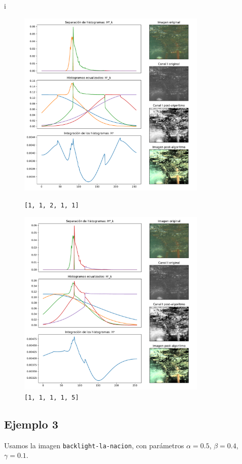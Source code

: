 i\begin{figure}[H]
\begin{minipage}[c]{0.48\linewidth}
  \includegraphics[height=9cm]{imgs/1908iv-11211.pdf}
  \caption{\texttt{[1, 1, 2, 1, 1]}}
\end{minipage}
\hfill
\begin{minipage}[c]{0.48\linewidth}
  \includegraphics[height=9cm]{imgs/1908iv-11115.pdf}
  \caption{\texttt{[1, 1, 1, 1, 5]}}
\end{minipage}%
\end{figure}

\subsection{Ejemplo 3}
Usamos la imagen \texttt{backlight-la-nacion}, con parámetros $\alpha = 0.5$, $\beta = 0.4$, $\gamma = 0.1$.

